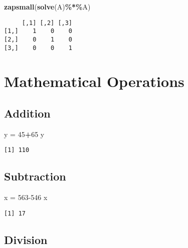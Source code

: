 \documentclass[
]{article}
\newenvironment{Shaded}{\begin{snugshade}}{\end{snugshade}}
\newcommand{\DecValTok}[1]{\textcolor[rgb]{0.00,0.00,0.81}{#1}}
\newcommand{\FunctionTok}[1]{\textcolor[rgb]{0.13,0.29,0.53}{\textbf{#1}}}
\newcommand{\NormalTok}[1]{#1}
\newcommand{\OtherTok}[1]{\textcolor[rgb]{0.56,0.35,0.01}{#1}}
\newcommand{\SpecialCharTok}[1]{\textcolor[rgb]{0.81,0.36,0.00}{\textbf{#1}}}
\begin{document}
\begin{Shaded}
\begin{Highlighting}[]
\FunctionTok{zapsmall}\NormalTok{(}\FunctionTok{solve}\NormalTok{(A)}\SpecialCharTok{\%*\%}\NormalTok{A)}
\end{Highlighting}
\end{Shaded}

\begin{verbatim}
     [,1] [,2] [,3]
[1,]    1    0    0
[2,]    0    1    0
[3,]    0    0    1
\end{verbatim}

\hypertarget{mathematical-operations}{%
\section{Mathematical Operations}\label{mathematical-operations}}

\hypertarget{addition}{%
\subsection{Addition}\label{addition}}

\begin{Shaded}
\begin{Highlighting}[]
\NormalTok{y }\OtherTok{=} \DecValTok{45}\SpecialCharTok{+}\DecValTok{65}
\NormalTok{y}
\end{Highlighting}
\end{Shaded}

\begin{verbatim}
[1] 110
\end{verbatim}

\hypertarget{subtraction}{%
\subsection{Subtraction}\label{subtraction}}

\begin{Shaded}
\begin{Highlighting}[]
\NormalTok{x }\OtherTok{=} \DecValTok{563{-}546}
\NormalTok{x}
\end{Highlighting}
\end{Shaded}

\begin{verbatim}
[1] 17
\end{verbatim}

\hypertarget{division}{%
\subsection{Division}\label{division}}
\end{document}
